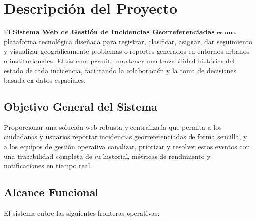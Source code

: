 \section{Descripción del Proyecto}
El \textbf{Sistema Web de Gestión de Incidencias Georreferenciadas} es una plataforma tecnológica diseñada para registrar, clasificar, asignar, dar seguimiento y visualizar geográficamente problemas o reportes generados en entornos urbanos o institucionales. El sistema permite mantener una trazabilidad histórica del estado de cada incidencia, facilitando la colaboración y la toma de decisiones basada en datos espaciales.

\subsection{Objetivo General del Sistema}
Proporcionar una solución web robusta y centralizada que permita a los ciudadanos y usuarios reportar incidencias georreferenciadas de forma sencilla, y a los equipos de gestión operativa canalizar, priorizar y resolver estos eventos con una trazabilidad completa de su historial, métricas de rendimiento y notificaciones en tiempo real.

\subsection{Alcance Funcional}
El sistema cubre las siguientes fronteras operativas:

